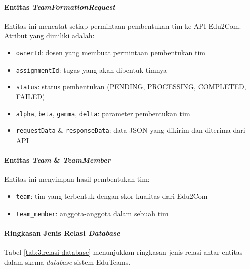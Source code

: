 \paragraph{Entitas \textit{TeamFormationRequest}}
Entitas ini mencatat setiap permintaan pembentukan tim ke API Edu2Com. Atribut yang dimiliki adalah:
\begin{itemize}
	\item \texttt{ownerId}: dosen yang membuat permintaan pembentukan tim
	\item \texttt{assignmentId}: tugas yang akan dibentuk timnya
	\item \texttt{status}: status pembentukan (PENDING, PROCESSING, COMPLETED, FAILED)
	\item \texttt{alpha}, \texttt{beta}, \texttt{gamma}, \texttt{delta}: parameter pembentukan tim
	\item \texttt{requestData} \& \texttt{responseData}: data JSON yang dikirim dan diterima dari API
\end{itemize}

\paragraph{Entitas \textit{Team} \& \textit{TeamMember}}
Entitas ini menyimpan hasil pembentukan tim:
\begin{itemize}
	\item \texttt{team}: tim yang terbentuk dengan skor kualitas dari Edu2Com
	\item \texttt{team\_member}: anggota-anggota dalam sebuah tim
\end{itemize}

\paragraph{Ringkasan Jenis Relasi \textit{Database}}
Tabel \ref{tab:3.relasi-database} menunjukkan ringkasan jenis relasi antar entitas dalam skema \textit{database} sistem EduTeams.

